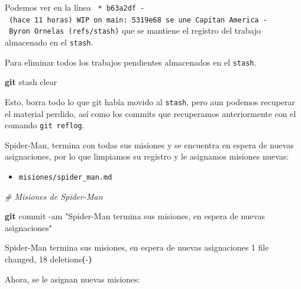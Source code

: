 \documentclass[
]{book}
\newenvironment{Shaded}{\begin{snugshade}}{\end{snugshade}}
\newcommand{\AttributeTok}[1]{\textcolor[rgb]{0.13,0.29,0.53}{#1}}
\newcommand{\CommentTok}[1]{\textcolor[rgb]{0.56,0.35,0.01}{\textit{#1}}}
\newcommand{\ErrorTok}[1]{\textcolor[rgb]{0.64,0.00,0.00}{\textbf{#1}}}
\newcommand{\ExtensionTok}[1]{#1}
\newcommand{\FunctionTok}[1]{\textcolor[rgb]{0.13,0.29,0.53}{\textbf{#1}}}
\newcommand{\KeywordTok}[1]{\textcolor[rgb]{0.13,0.29,0.53}{\textbf{#1}}}
\newcommand{\NormalTok}[1]{#1}
\newcommand{\StringTok}[1]{\textcolor[rgb]{0.31,0.60,0.02}{#1}}
\providecommand{\tightlist}{%
  \setlength{\itemsep}{0pt}\setlength{\parskip}{0pt}}
\begin{document}
Podemos ver en la línea \texttt{\textbar{}\ *\ b63a2df\ -\ (hace\ 11\ horas)\ WIP\ on\ main:\ 5319e68\ se\ une\ Capitan\ America\ -\ Byron\ Ornelas\ (refs/stash)} que se mantiene el registro del trabajo almacenado en el \texttt{stash}.

Para eliminar todos los trabajos pendientes almacenados en el \texttt{stash}.

\begin{Shaded}
\begin{Highlighting}[]
\FunctionTok{git}\NormalTok{ stash clear}
\end{Highlighting}
\end{Shaded}

Esto, borra todo lo que git había movido al \texttt{stash}, pero aun podemos recuperar el material perdido, así como los commits que recuperamos anteriormente con el comando \texttt{git\ reflog}.

Spider-Man, termina con todas sus misiones y se encuentra en espera de nuevas asignaciones, por lo que limpiamos su registro y le asignamos misiones nuevas:

\begin{itemize}
\tightlist
\item
  \texttt{misiones/spider\_man.md}
\end{itemize}

\begin{Shaded}
\begin{Highlighting}[]
\CommentTok{\# Misiones de Spider{-}Man}
\end{Highlighting}
\end{Shaded}

\begin{Shaded}
\begin{Highlighting}[]
\FunctionTok{git}\NormalTok{ commit }\AttributeTok{{-}am} \StringTok{"Spider{-}Man termina sus misiones, en espera de nuevas asignaciones"}
\end{Highlighting}
\end{Shaded}

\begin{Shaded}
\begin{Highlighting}[]
\ExtensionTok{[main}\NormalTok{ 8051202] Spider{-}Man termina sus misiones, en espera de nuevas asignaciones}
 \ExtensionTok{1}\NormalTok{ file changed, 18 deletions}\ErrorTok{(}\ExtensionTok{{-}}\KeywordTok{)}
\end{Highlighting}
\end{Shaded}

Ahora, se le asignan nuevas misiones:
\end{document}
